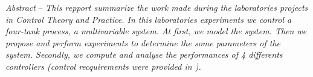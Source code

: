 \begin{bfseries}
\emph{Abstract} -- 
\emph{
This repport summarize the work made during the laboratories projects in \emph{Control Theory and Practice}.
In this laboratories experiments we control a four-tank process, a multivariable system.
At first, we model the system. 
Then we propose and perform experiments to determine the some parameters of the system.
Secondly, we compute and analyse the performances of 4 differents controllers (control recquirements were provided in \cite{subject}). 
}
\end{bfseries}
